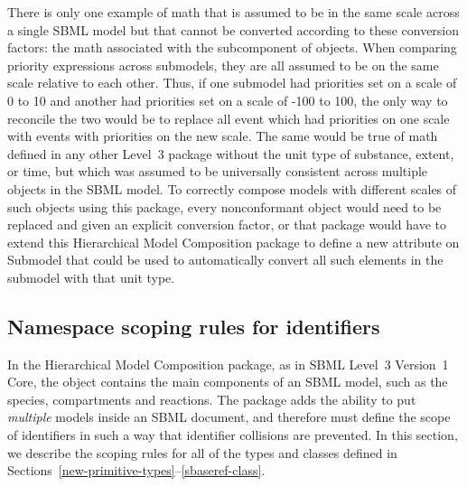 There is only one example of math that is assumed to be in the same scale
across a single SBML model but that cannot be converted according to
these conversion factors:  the math associated with the \Priority
subcomponent of \Event objects.  When comparing priority expressions 
across submodels,
they are all assumed to be on the same scale relative to each other.
Thus, if one submodel had priorities set on a scale of 0 to 10 and another had
priorities set on a scale of -100 to 100, the only way to reconcile the 
two would be to replace all event which had priorities on one scale with
events with priorities on the new scale.
The same would be true of math defined in any other Level~3 package
without the unit type of substance, extent, or time, but which was assumed to
be universally consistent across multiple objects in the SBML model.
To correctly compose models with different scales of such objects using
this package, every nonconformant object would need to be replaced and
given an explicit conversion factor, or that package would have to
extend this Hierarchical Model Composition package to define a new
attribute on Submodel that could be used to automatically convert all
such elements in the submodel with that unit type.


\clearpage

\subsection{Namespace scoping rules for identifiers}
\label{namespaces}

In the Hierarchical Model Composition package, as in SBML Level~3
Version~1 Core, the \Model object contains the main components of an
SBML model, such as the species, compartments and reactions.  The
package adds the ability to put \emph{multiple} models inside an SBML
document, and therefore must define the scope of identifiers in such a
way that identifier collisions are prevented.  In this section, we
describe the scoping rules for all of the types and classes defined in
Sections~\ref{new-primitive-types}--\ref{sbaseref-class}.

